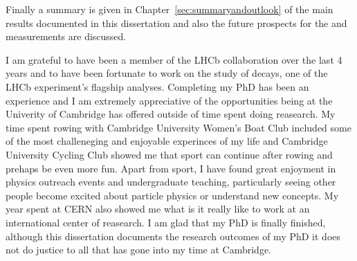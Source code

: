 Finally a summary is given in Chapter~\ref{sec:summaryandoutlook} of the main results documented in this dissertation and also the future prospects for the \BF and \el measurements are discussed. 

I am grateful to have been a member of the LHCb collaboration over the last 4 years and to have been fortunate to work on the study of \bmumu decays, one of the LHCb experiment's flagship analyses. Completing my PhD has been an experience and I am extremely appreciative of the opportunities being at the Univerity of Cambridge has offered outside of time spent doing reasearch. My time spent rowing with Cambridge University Women's Boat Club included some of the most challeneging and enjoyable experinces of my life and Cambridge University Cycling Club showed me that sport can continue after rowing and prehaps be even more fun. 
Apart from sport, I have found great enjoyment in physics outreach events and undergraduate teaching, particularly seeing other people become excited about particle physics or understand new concepts. My year spent at CERN also showed me what is it really like to work at an international center of reasearch. I am glad that my PhD is finally finished, although this dissertation documents the research outcomes of my PhD it does not do justice to all that has gone into my time at Cambridge.
